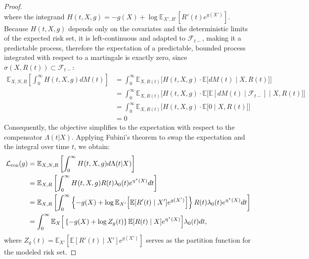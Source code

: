 \documentclass[11pt]{article}
\theoremstyle{plain}
\theoremstyle{plain}
\theoremstyle{plain}
\theoremstyle{plain}
\theoremstyle{plain}
\theoremstyle{plain}
\theoremstyle{plain}
\begin{document}
\begin{proof}
\begin{equation}
\end{equation}
where the integrand $H(t, X, g) = -g(X) + \log \mathbb{E}_{X', R'} [ R'(t) e^{g(X')} ]$. Because $H(t, X, g)$ depends only on the covariates and the deterministic limits of the expected risk set, it is left-continuous and adapted to $\mathcal{F}_{t-}$, making it a predictable process, therefore the expectation of a predictable, bounded process integrated with respect to a martingale is exactly zero, since $\sigma(X, R(t)) \subset \mathcal{F}_{t-}$:
\begin{align*}
    \mathbb{E}_{X, N, R} \left[ \int_0^\infty H(t, X, g) dM(t) \right] &= \int_0^\infty \mathbb{E}_{X, R(t)} \Bigg[ H(t, X, g) \cdot \mathbb{E}\Big[ dM(t)\mid X, R(t) \Big] \Bigg] \\
    &= \int_0^\infty \mathbb{E}_{X, R(t)} \Bigg[ H(t, X, g) \cdot   \mathbb{E} \Big[ \mathbb{E}[dM(t) \mid \mathcal{F}_{t-}] \mid X, R(t) \Big] \Bigg] \\
    &= \int_0^\infty \mathbb{E}_{X, R(t)} \Bigg[ H(t, X, g) \cdot   \mathbb{E} \Big[ 0 \mid X, R(t) \Big] \Bigg] \\
     &= 0
\end{align*}
Consequently, the objective simplifies to the expectation with respect to the compensator $\Lambda(t|X)$. Applying Fubini's theorem to swap the expectation and the integral over time $t$, we obtain:
\begin{align}
    \mathcal{L}_{\textup{cox}}(g) &= \mathbb{E}_{X, N, R} \left[ \int_0^\infty  H(t, X, g) d\Lambda(t|X) \right] \notag \\
    &= \mathbb{E}_{X, R} \left[ \int_0^\infty  H(t, X, g) R(t) \lambda_0(t) e^{\eta^\star(X)} dt \right] \notag \\
    &= \mathbb{E}_{X, R} \left[ \int_0^\infty \left\{ -g(X) + \log \mathbb{E}_{X'} \Big[ \mathbb{E}[R'(t) \mid X'] e^{g(X')} \Big] \right\} R(t) \lambda_0(t) e^{\eta^\star(X)} dt \right] \notag \\
    &= \int_0^\infty \mathbb{E}_X \Big[ \left\{ -g(X) + \log Z_g(t) \right\} \mathbb{E}[R(t) \mid X] e^{\eta^\star(X)} \Big] \lambda_0(t) dt, \label{eq:cox_step1_app}
\end{align}
where $Z_g(t) = \mathbb{E}_{X'} [ \mathbb{E}[R'(t) \mid X'] e^{g(X')} ]$ serves as the partition function for the modeled risk set.


\end{proof}
\end{document}
